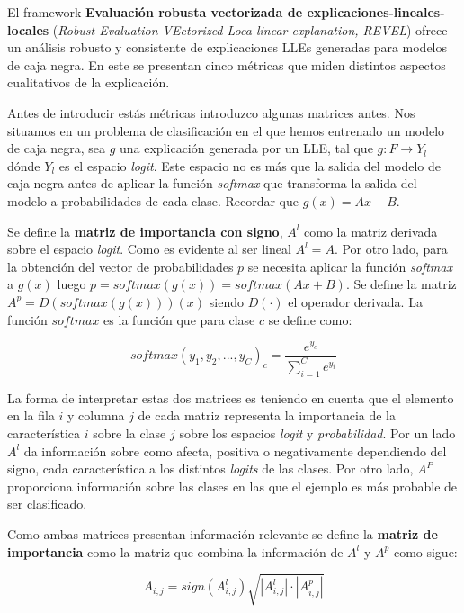 El framework \textbf{Evaluación robusta vectorizada de explicaciones-lineales-locales} (\textit{Robust Evaluation VEctorized Loca-linear-explanation, REVEL}) \cite{REVEL} ofrece un análisis robusto y consistente de explicaciones LLEs generadas para modelos de caja negra. En este se presentan cinco métricas que miden distintos aspectos cualitativos de la explicación. 

Antes de introducir estás métricas introduzco algunas matrices antes. Nos situamos en un problema de clasificación en el que hemos entrenado un modelo de caja negra, sea $g$ una explicación generada por un LLE, tal que $g: F \rightarrow Y_l$ dónde $Y_l$ es el espacio \textit{logit}. Este espacio no es más que la salida del modelo de caja negra antes de aplicar la función \textit{softmax} que transforma la salida del modelo a probabilidades de cada clase. Recordar que $g(x) = Ax + B$. 

Se define la \textbf{matriz de importancia con signo}, $A^l$ como la matriz derivada sobre el espacio \textit{logit}. Como es evidente al ser lineal $A^l = A$. Por otro lado, para la obtención del vector de probabilidades $p$ se necesita aplicar la función \textit{softmax} a $g(x)$ luego $p=softmax(g(x))=softmax(Ax+B)$. Se define la matriz $A^p = D(softmax(g(x)))(x)$ siendo $D(\cdot)$ el operador derivada. La función $softmax$ es la función que para clase $c$ se define como:

\begin{equation}
softmax(y_1,y_2,...,y_C)_c = \frac{e^{y_c}}{\sum_{i=1}^C e^{y_i}}
\end{equation}
 
La forma de interpretar estas dos matrices es teniendo en cuenta que el elemento en la fila $i$ y columna $j$ de cada matriz representa la importancia de la característica $i$ sobre la clase $j$ sobre los espacios \textit{logit} y \textit{probabilidad}. Por un lado $A^l$ da información sobre como afecta, positiva o negativamente dependiendo del signo, cada característica a los distintos \textit{logits} de las clases. Por otro lado, $A^P$ proporciona información sobre las clases en las que el ejemplo es más probable de ser clasificado.

Como ambas matrices presentan información relevante se define la \textbf{matriz de importancia} como la matriz que combina la información de $A^l$ y $A^p$ como sigue:

\begin{equation}
A_{i,j} = sign(A^l_{i,j}) \sqrt{|A^l_{i,j}|\cdot|A^p_{i,j}|}
\end{equation}

